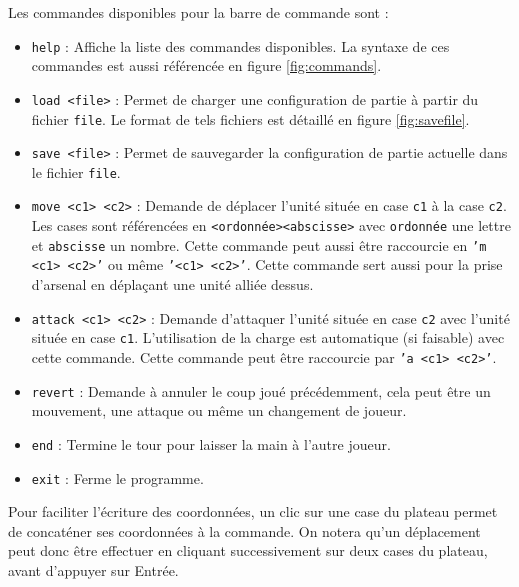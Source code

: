\documentclass[a4paper]{report}
\begin{document}



Les commandes disponibles pour la barre de commande sont :
\begin{itemize}
\item \texttt{help} : Affiche la liste des commandes disponibles. La syntaxe de ces commandes est aussi référencée en figure \ref{fig:commands}.
\item \texttt{load <file>} : Permet de charger une configuration de partie à partir du fichier \texttt{file}. Le format de tels fichiers est détaillé en figure \ref{fig:savefile}.
\item \texttt{save <file>} : Permet de sauvegarder la configuration de partie actuelle dans le fichier \texttt{file}.
\item \texttt{move <c1> <c2>} : Demande de déplacer l'unité située en case \texttt{c1} à la case \texttt{c2}. Les cases sont référencées en \texttt{<ordonnée><abscisse>} avec \texttt{ordonnée} une lettre et \texttt{abscisse} un nombre. Cette commande peut aussi être raccourcie en \texttt{'m <c1> <c2>'} ou même \texttt{'<c1> <c2>'}. Cette commande sert aussi pour la prise d'arsenal en déplaçant une unité alliée dessus.
\item \texttt{attack <c1> <c2>} : Demande d'attaquer l'unité située en case \texttt{c2} avec l'unité située en case \texttt{c1}. L'utilisation de la charge est automatique (si faisable) avec cette commande. Cette commande peut être raccourcie par \texttt{'a <c1> <c2>'}.
\item \texttt{revert} : Demande à annuler le coup joué précédemment, cela peut être un mouvement, une attaque ou même un changement de joueur.
\item \texttt{end} : Termine le tour pour laisser la main à l'autre joueur.
\item \texttt{exit} : Ferme le programme.
\end{itemize}

Pour faciliter l'écriture des coordonnées, un clic sur une case du plateau permet de concaténer ses coordonnées à la commande. On notera qu'un déplacement peut donc être effectuer en cliquant successivement sur deux cases du plateau, avant d'appuyer sur Entrée.
\end{document}
